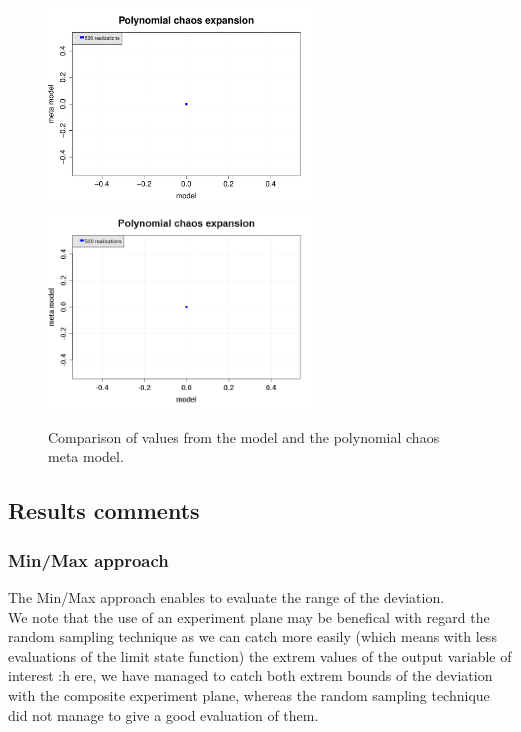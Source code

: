 \documentclass[11pt]{article}
\begin{document}
\begin{figure}[Hhbtp]
  \begin{center}
    \ifpdf
    \includegraphics[width=7cm]{PCE_comparisonModels.pdf}
    \else
    \includegraphics[width=7cm]{PCE_comparisonModels.png}
    \fi
    \caption{Comparison of values from the model and the polynomial chaos meta model.}
    \label{ModelsComparison}
  \end{center}
\end{figure}




\subsection{Results comments}

\subsubsection{Min/Max approach}

The Min/Max approach enables to evaluate the range of the deviation.\\

We note that the use of an experiment plane may be benefical with regard the random sampling technique as we can catch more easily (which means with less evaluations of the limit state function) the extrem values of the output variable of interest :h ere, we have managed to catch both extrem bounds of the deviation with the composite experiment plane, whereas the random sampling technique did not manage to give a good evaluation of them.\\
\end{document}
